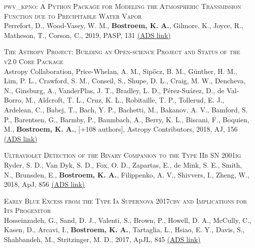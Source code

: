 \begin{revnumerate}[67]
    \item{\textsc{pwv\_kpno: A Python Package for Modeling the Atmospheric Transmission Function due to Precipitable Water Vapor}\\ 
    Perrefort, D., Wood-Vasey, W. M., \textbf{Bostroem, K. A.}, Gilmore, K., Joyce, R., Matheson, T., Corson, C., 2019, PASP, 131 
    \color{blue}\href{https://ui.adsabs.harvard.edu/abs/2019PASP..131b5002P}{(ADS link)}\color{black}}\\
    
    \item{\textsc{The Astropy Project: Building an Open-science Project and Status of the v2.0 Core Package}\\ 
    Astropy Collaboration, Price-Whelan, A. M., Sip\H{o}cz, B. M., Günther, H. M., Lim, P. L., Crawford, S. M., Conseil, S., Shupe, D. L., Craig, M. W., Dencheva, N., Ginsburg, A., VanderPlas, J. T., Bradley, L. D., P\'{e}rez-Su\'{a}rez, D., de Val-Borro, M., Aldcroft, T. L., Cruz, K. L., Robitaille, T. P., Tollerud, E. J., Ardelean, C., Babej, T., Bach, Y. P., Bachetti, M., Bakanov, A. V., Bamford, S. P., Barentsen, G., Barmby, P., Baumbach, A., Berry, K. L., Biscani, F., Boquien, M., \textbf{Bostroem, K. A.}, [+108 authors], Astropy Contributors, 2018, AJ, 156 
    \color{blue}\href{https://ui.adsabs.harvard.edu/abs/2018AJ....156..123A}{(ADS link)}\color{black}}\\
    
    \item{\textsc{Ultraviolet Detection of the Binary Companion to the Type IIb SN 2001ig}\\ 
    Ryder, S. D., Van Dyk, S. D., Fox, O. D., Zapartas, E., de Mink, S. E., Smith, N., Brunsden, E., \textbf{Bostroem, K. A.}, Filippenko, A. V., Shivvers, I., Zheng, W., 2018, ApJ, 856 
    \color{blue}\href{https://ui.adsabs.harvard.edu/abs/2018ApJ...856...83R}{(ADS link)}\color{black}}\\
    
    \item{\textsc{Early Blue Excess from the Type Ia Supernova 2017cbv and Implications for Its Progenitor}\\ 
    Hosseinzadeh, G., Sand, D. J., Valenti, S., Brown, P., Howell, D. A., McCully, C., Kasen, D., Arcavi, I., \textbf{Bostroem, K. A.}, Tartaglia, L., Hsiao, E. Y., Davis, S., Shahbandeh, M., Stritzinger, M. D., 2017, ApJL, 845 
    \color{blue}\href{https://ui.adsabs.harvard.edu/abs/2017ApJ...845L..11H}{(ADS link)}\color{black}}\\
    

\end{revnumerate}
